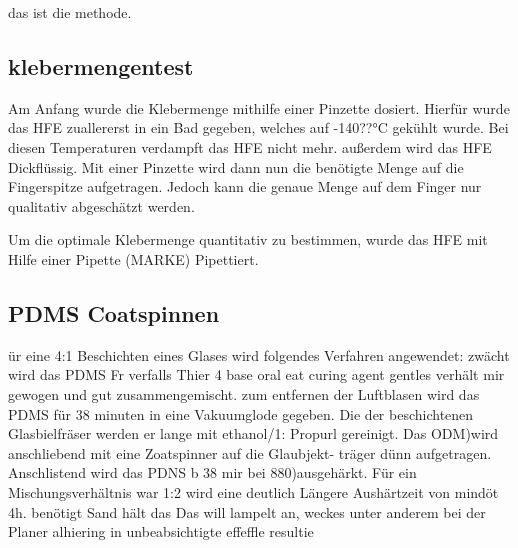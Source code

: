 das ist die methode.

\subsection{klebermengentest}
Am Anfang wurde die Klebermenge mithilfe einer Pinzette dosiert. Hierfür wurde das HFE zuallererst in ein Bad gegeben, welches auf -140??°C gekühlt wurde. Bei diesen Temperaturen verdampft das HFE nicht mehr. außerdem wird das HFE Dickflüssig. Mit einer Pinzette wird dann nun die benötigte Menge auf die Fingerspitze aufgetragen. Jedoch kann die genaue Menge auf dem Finger nur qualitativ abgeschätzt werden.

Um die optimale Klebermenge quantitativ zu bestimmen, wurde das HFE mit Hilfe einer Pipette (MARKE) Pipettiert. 

\subsection{PDMS Coatspinnen}

ür eine 4:1 Beschichten eines Glases wird folgendes
Verfahren angewendet: zwächt wird das PDMS Fr
verfalls Thier 4 base oral eat curing agent gentles
verhält mir gewogen und gut zusammengemischt.
zum entfernen der Luftblasen wird das PDMS für
38 minuten in eine Vakuumglode gegeben. Die
der beschichtenen Glasbielfräser werden er lange mit
ethanol/1: Propurl gereinigt. Das ODM)wird
anschliebend mit eine Zoatspinner auf die Glaubjekt-
träger dünn aufgetragen. Anschlistend wird das PDNS
b 38 mir bei 880)ausgehärkt.
Für ein Mischungsverhältnis war 1:2 wird eine deutlich
Längere Aushärtzeit von mindöt 4h. benötigt Sand hält das
Das will lampelt an, weckes unter anderem bei der Planer
alhiering in unbeabsichtigte effeffle resultie